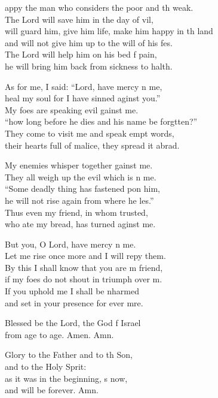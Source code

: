 \settowidth{\versewidth}{will guard him, give him life, make him happy in the land *}
\begin{psalmverse}%
  \begin{patverse}
appy the man who considers the poor and th weak.\Med\\
The Lord will save him in the day of vil,\\
will guard him, give him life, make him happy in th land\Med\\
and will not give him up to the will of his fes.\\
The Lord will help him on his bed f pain,\Med\\
he will bring him back from sickness to halth.

As for me, I said: “Lord, have mercy n me,\Med\\
heal my soul for I have sinned aginst you.”\\
My foes are speaking evil gainst me.\Med\\
“how long before he dies and his name be forgtten?”\Med\\
They come to visit me and speak empt words,\\
their hearts full of malice, they spread it abrad.

My enemies whisper together gainst me.\Med\\
They all weigh up the evil which is n me.\\
“Some deadly thing has fastened pon him,\Med\\
he will not rise again from where he l\pointup{\i}es.”\\
Thus even my friend, in whom  trusted,\Med\\
who ate my bread, has turned aginst me.

But you, O Lord, have mercy n me.\Med\\
Let me rise once more and I will repy them.\\
By this I shall know that you are m friend,\Med\\
if my foes do not shout in triumph over m.\\
If you uphold me I shall be nharmed\Med\\
and set in your presence for ever mre.

Blessed be the Lord, the God f Israel\Med\\
from age to age. Amen. Amn.

Glory to the Father and to th Son,\Med\\
and to the Holy Sp\pointup{\i}rit:\\
as it was in the beginning, \pointup{\i}s now,\Med\\
and will be forever. Amn. 
  \end{patverse}
\end{psalmverse}
